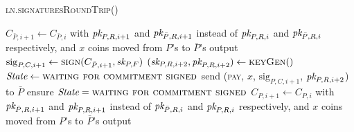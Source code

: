\begin{center}
  \begin{processbox}{\textsc{ln}.\textsc{signaturesRoundTrip}()}
    \ \\
    \begin{algorithmic}[1]
      \State $C_{\bar{P}, i+1} \gets C_{\bar{P}, i}$ with $\textit{pk}_{P, R, i+1}$ and
      $\textit{pk}_{\bar{P}, R, i+1}$ instead of $\textit{pk}_{P, R, i}$ and $\textit{pk}_{\bar{P}, R, i}$
      respectively, and $x$ coins moved from $P$'s to $\bar{P}$'s output
      \label{code:ln:pay:signatures:new-comm}
      \State $\mathrm{sig}_{P, C, i+1} \gets \textsc{sign}(C_{\bar{P}, i+1},
      \textit{sk}_{P, F})$ 
      \label{code:ln:pay:signatures:sign-new-comm}
      \State $(\textit{sk}_{P, R, i+2}, \textit{pk}_{P, R, i+2}) \gets \textsc{keyGen}()$
      \State $\itistate \gets \textsc{waiting for commitment signed}$
      \State send (\textsc{pay}, $x$, $\mathrm{sig}_{P, C, i+1}$, $\textit{pk}_{P, R,
      i+2}$) to $\bar{P}$
      \label{code:ln:pay:signatures:pay}
      \State {}
      \State {}
      \State {}
      \State {}
      \label{code:ln:pay:signatures:verify}
      \State {}
      \State {} 
      \State {}
      \State {}
      \State {}
      \State {}
      \State {}
      \State ensure $\itistate = \textsc{waiting for commitment signed}$
      \State $C_{P, i+1} \gets C_{P, i}$ with $\textit{pk}_{\bar{P}, R, i+1}$ and $\textit{pk}_{P,
      R, i+1}$ instead of $\textit{pk}_{\bar{P}, R, i}$ and $\textit{pk}_{P, R, i}$ respectively,
      and $x$ coins moved from $P$'s to $\bar{P}$'s output
    \end{algorithmic}
  \end{processbox}
  \label{code:ln:pay:signatures}
\end{center} \ \\

